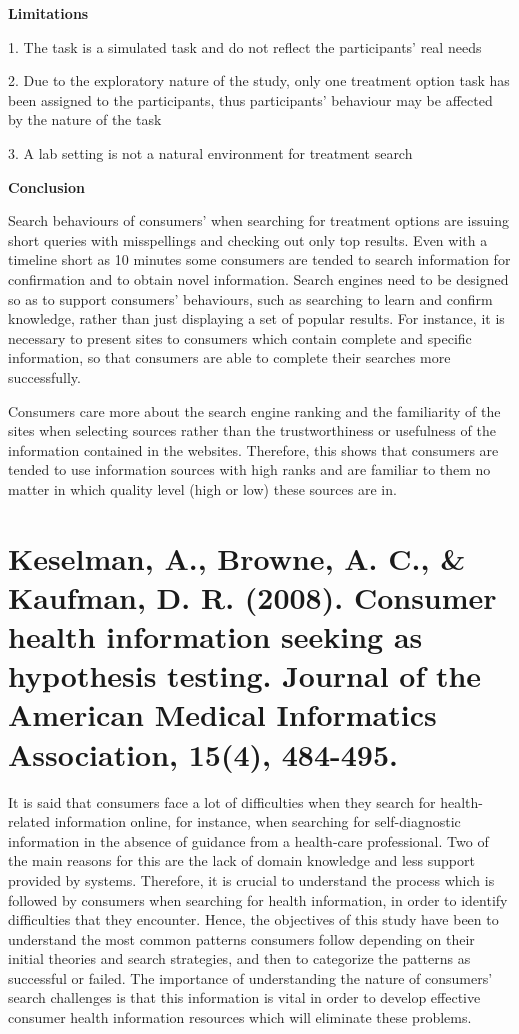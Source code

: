 \documentclass[]{article}
\begin{document}
\textbf{Limitations}

1.	The task is a simulated task and do not reflect the participants’ real needs

2.	Due to the exploratory nature of the study, only one treatment option task has been assigned to the participants, thus participants’ behaviour may be affected by the nature of the task 
     
3.	A lab setting is not a natural environment for treatment search
    
\textbf{Conclusion}

Search behaviours of consumers’ when searching for treatment options are issuing short queries with misspellings and checking out only top results. Even with a timeline short as 10 minutes some consumers are tended to search information for confirmation and to obtain novel information. Search engines need to be designed so as to support consumers’ behaviours, such as searching to learn and confirm knowledge, rather than just displaying a set of popular results. For instance, it is necessary to present sites to consumers which contain complete and specific information, so that consumers are able to complete their searches more successfully. 
  
Consumers care more about the search engine ranking and the familiarity of the sites when selecting sources rather than the trustworthiness or usefulness of the information contained in the websites. Therefore, this shows that consumers are tended to use information sources with high ranks and are familiar to them no matter in which quality level (high or low) these sources are in.  

\section{Keselman, A., Browne, A. C., \& Kaufman, D. R. (2008). Consumer health information seeking as hypothesis testing. Journal of the American Medical Informatics Association, 15(4), 484-495.} 

It is said that consumers face a lot of difficulties when they search for health-related information online, for instance, when searching for self-diagnostic information in the absence of guidance from a health-care professional. Two of the main reasons for this are the lack of domain knowledge and less support provided by systems. Therefore, it is crucial to understand the process which is followed by consumers when searching for health information, in order to identify difficulties that they encounter. Hence, the objectives of this study have been to understand the most common patterns consumers follow depending on their initial theories and search strategies, and then to categorize the patterns as successful or failed. The importance of understanding the nature of consumers’ search challenges is that this information is vital in order to develop effective consumer health information resources which will eliminate these problems.  
\end{document}
